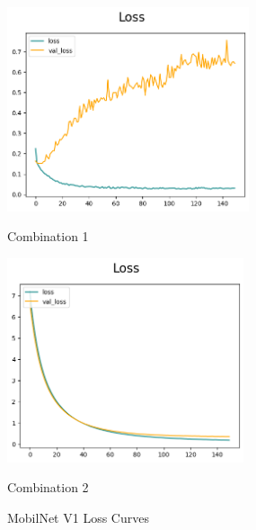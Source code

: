\begin{figure}[H]
    \centering
    \begin{minipage}[b]{0.49\textwidth}
        \centering
        \includegraphics[width=\textwidth, height=6cm]{Figures/balanced_data/more_data/withoutbn/mn1/loss.png}
        \captionsetup{labelformat=empty}
        \caption{Combination 1}
        \label{fig:u_wo_r_l}
    \end{minipage}
    \hfill
    \begin{minipage}[b]{0.49\textwidth}
        \centering
        \includegraphics[width=\textwidth, height=6cm]{Figures/balanced_data/more_data/withbn/mn1/loss.png}
        \captionsetup{labelformat=empty}
        \caption{Combination 2}
        \label{fig:u_w_r_l}
    \end{minipage}
    \captionsetup{labelformat=default}
    \caption{MobilNet V1 Loss Curves}
\end{figure}

